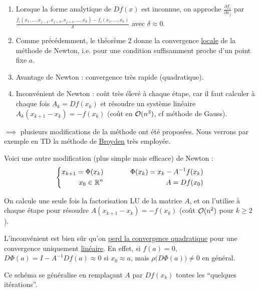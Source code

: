     \begin{remark}
        \begin{enumerate}[label=-]
            \item Lorsque la forme analytique de $Df(x)$ est inconnue, on approche
                $\displaystyle\frac{\partial f_i}{\partial x_j}$ par $\displaystyle\frac{f_i(x_1,\dots,x_{j-1},x_{j+\delta},x_{j+1},\dots,x_n) - f_i(x_1, \dots, x_n)}{\delta}$ avec $\delta \approx 0$.

            \item Comme précédemment, le théorème 2 donne la convergence \underline{locale}
                de la méthode de Newton, i.e. pour une condition suffisamment proche d'un
                point fixe $a$.

            \item Avantage de Newton : convergence très rapide (quadratique).

            \item Inconvénient de Newton : coût très élevé à chaque étape, car il faut
                calculer à chaque fois $A_k = Df(x_k)$ et résoudre un système linéaire
                $A_k(x_{k+1} - x_k) = -f(x_k)$ (coût en $\mathcal{O}(n^3)$, cf méthode de Gauss).
        \end{enumerate}

        $\implies$ plusieurs modifications de la méthode ont été proposées. Nous verrons
        par exemple en TD la méthode de \underline{Broyden} très employée.
        
        Voici une autre modification (plus simple mais efficace) de Newton :
        \begin{equation*}
            \left\lbrace
            \begin{split}
                x_{k+1}  = \Phi(x_k) & \hspace{1cm} & \Phi(x_k) = x_k - A^{-1}f(x_k) \\
                x_0  \in \mathbb{R}^n & & A = Df(x_0)
            \end{split}
            \right.
        \end{equation*}

        On calcule une seule fois la factorisation LU de la matrice $A$, et on l'utilise
        à chaque étape pour résoudre $A(x_{k+1} - x_k) = -f(x_k)$ (coût $\mathcal{O}(n^2)$ pour $k\geq 2$).

        L'inconvénient est bien sûr qu'on \underline{perd la convergence quadratique} pour
        une convergence uniquement \underline{linéaire}. En effet, si $f(a) = 0$,
        $D\Phi(a) = I - A^{-1}Df(a) \approx 0$ si $x_0 \approx a$, mais
        $\rho \Big( D\Phi(a) \Big) \ne 0$ en général.

        Ce schéma se généralise en remplaçant $A$ par $Df(x_k)$ toutes les ``quelques
        itérations''.
    \end{remark}





